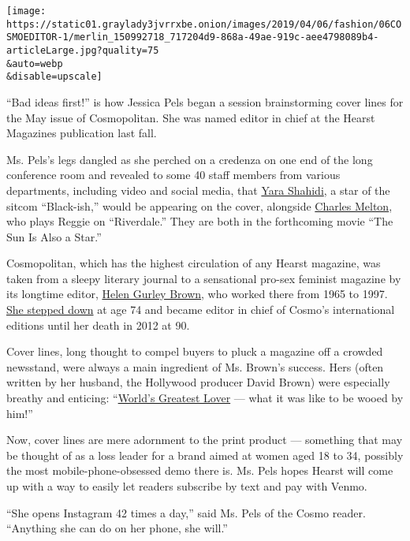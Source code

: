 \texttt{[image: https://static01.graylady3jvrrxbe.onion/images/2019/04/06/fashion/06COSMOEDITOR-1/merlin\_150992718\_717204d9-868a-49ae-919c-aee4798089b4-articleLarge.jpg?quality=75\\\&auto=webp\\\&disable=upscale]}

``Bad ideas first!'' is how Jessica Pels began a session brainstorming
cover lines for the May issue of Cosmopolitan. She was named editor in
chief at the Hearst Magazines publication last fall.

Ms. Pels's legs dangled as she perched on a credenza on one end of the
long conference room and revealed to some 40 staff members from various
departments, including video and social media, that
\href{https://www.nytimes3xbfgragh.onion/2018/01/09/arts/television/grown-ish-review-freeform.html}{Yara
Shahidi}, a star of the sitcom ``Black-ish,'' would be appearing on the
cover, alongside \href{https://www.instagram.com/melton/?hl=en}{Charles
Melton}, who plays Reggie on ``Riverdale.'' They are both in the
forthcoming movie ``The Sun Is Also a Star.''

Cosmopolitan, which has the highest circulation of any Hearst magazine,
was taken from a sleepy literary journal to a sensational pro-sex
feminist magazine by its longtime editor,
\href{https://www.nytimes3xbfgragh.onion/2012/08/14/business/media/helen-gurley-brown-who-gave-cosmopolitan-its-purr-is-dead-at-90.html}{Helen
Gurley Brown}, who worked there from 1965 to 1997.
\href{https://www.nytimes3xbfgragh.onion/2015/08/23/fashion/helen-gurley-brown-cosmopolitan-editor-hearst-legacy.html}{She
stepped down} at age 74 and became editor in chief of Cosmo's
international editions until her death in 2012 at 90.

Cover lines, long thought to compel buyers to pluck a magazine off a
crowded newsstand, were always a main ingredient of Ms. Brown's success.
Hers (often written by her husband, the Hollywood producer David Brown)
were especially breathy and enticing:
``\href{https://www.cnn.com/2012/08/17/living/helen-gurley-brown-legacy/index.html}{World's
Greatest Lover} --- what it was like to be wooed by him!''

Now, cover lines are mere adornment to the print product --- something
that may be thought of as a loss leader for a brand aimed at women aged
18 to 34, possibly the most mobile-phone-obsessed demo there is. Ms.
Pels hopes Hearst will come up with a way to easily let readers
subscribe by text and pay with Venmo.

``She opens Instagram 42 times a day,'' said Ms. Pels of the Cosmo
reader. ``Anything she can do on her phone, she will.''

